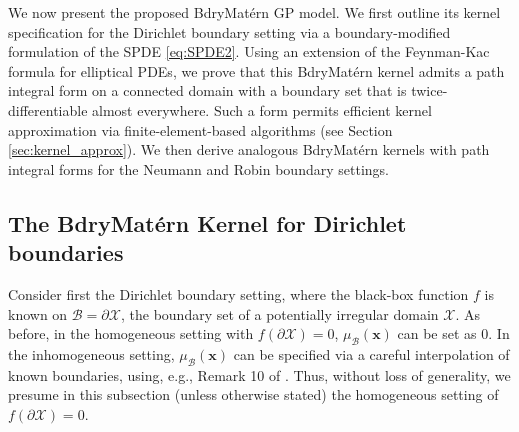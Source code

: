 \documentclass[aos,preprint]{imsart}
\theoremstyle{plain}
\theoremstyle{remark}
\begin{document}
We now present the proposed BdryMat\'ern GP model. We first outline its kernel specification for the Dirichlet boundary setting via a boundary-modified formulation of the SPDE \eqref{eq:SPDE2}. Using an extension of the Feynman-Kac formula for elliptical PDEs, we prove that this BdryMat\'ern kernel admits a path integral form on a connected domain with a boundary set that is twice-differentiable almost everywhere. Such a form permits efficient kernel approximation via finite-element-based algorithms (see Section \ref{sec:kernel_approx}). We then derive analogous BdryMat\'ern kernels with path integral forms for the Neumann and Robin boundary settings. 

\subsection{The BdryMat\'ern Kernel for Dirichlet boundaries}
\label{sec:BdryGP_Green}

Consider first the Dirichlet boundary setting, where the black-box function $f$ is known on $\mathcal{B} = \partial \mathcal{X}$, the boundary set of a potentially irregular domain $\mathcal{X}$. As before, in the homogeneous setting with $f(\partial \mathcal{X}) = 0$, $\mu_{\mathcal{B}}(\mathbf{x})$ can be set as 0. In the inhomogeneous setting, $\mu_{\mathcal{B}}(\mathbf{x})$ can be specified via a careful interpolation of known boundaries, using, e.g., Remark 10 of \cite{dalton2024boundary}. Thus, without loss of generality, we presume in this subsection (unless otherwise stated) the homogeneous setting of $f(\partial \mathcal{X}) = 0$.
\end{document}
